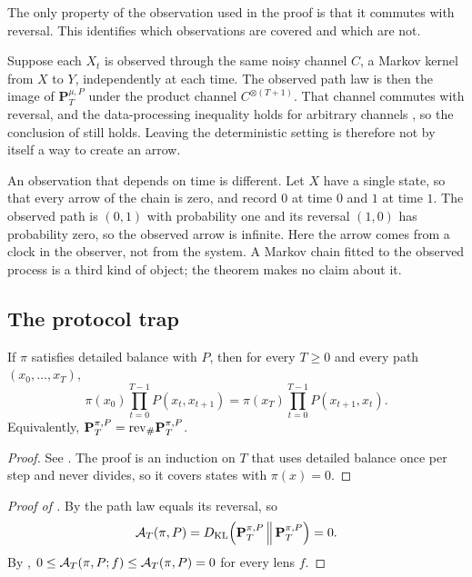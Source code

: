 The only property of the observation used in the proof is that it commutes with reversal.
This identifies which observations are covered and which are not.

\begin{remark}\label{rem:arrow_scope}
Suppose each $X_t$ is observed through the same noisy channel $C$, a Markov kernel from $X$ to $Y$, independently at each time.
The observed path law is then the image of $\mathbf{P}^{\mu,P}_T$ under the product channel $C^{\otimes(T+1)}$.
That channel commutes with reversal, and the data-processing inequality holds for arbitrary channels \citep{CoverThomas2006}, so the conclusion of \thmNGArrowDPI{} still holds.
Leaving the deterministic setting is therefore not by itself a way to create an arrow.

An observation that depends on time is different.
Let $X$ have a single state, so that every arrow of the chain is zero, and record $0$ at time $0$ and $1$ at time $1$.
The observed path is $(0,1)$ with probability one and its reversal $(1,0)$ has probability zero, so the observed arrow is infinite.
Here the arrow comes from a clock in the observer, not from the system.
A Markov chain fitted to the observed process is a third kind of object; the theorem makes no claim about it.
\end{remark}

\subsection{The protocol trap}

\begin{lemma}\label{lem:detailed_balance_path}
If $\pi$ satisfies detailed balance with $P$, then for every $T\ge 0$ and every path $(x_0,\dots,x_T)$,
\[
  \pi(x_0)\prod_{t=0}^{T-1}P(x_t,x_{t+1})=\pi(x_T)\prod_{t=0}^{T-1}P(x_{t+1},x_t).
\]
Equivalently, $\mathbf{P}^{\pi,P}_T=\mathrm{rev}_{\#}\mathbf{P}^{\pi,P}_T$.
\end{lemma}

\begin{proof}
See .
The proof is an induction on $T$ that uses detailed balance once per step and never divides, so it covers states with $\pi(x)=0$.
\end{proof}

\begin{proof}[Proof of ]
By  the path law equals its reversal, so
\[
  \mathcal{A}_T(\pi,P)=D_{\mathrm{KL}}\!\left(\mathbf{P}^{\pi,P}_T\,\middle\|\,\mathbf{P}^{\pi,P}_T\right)=0.
\]
By \thmNGArrowDPI, $0\le\mathcal{A}_T(\pi,P;f)\le\mathcal{A}_T(\pi,P)=0$ for every lens $f$.
\end{proof}

